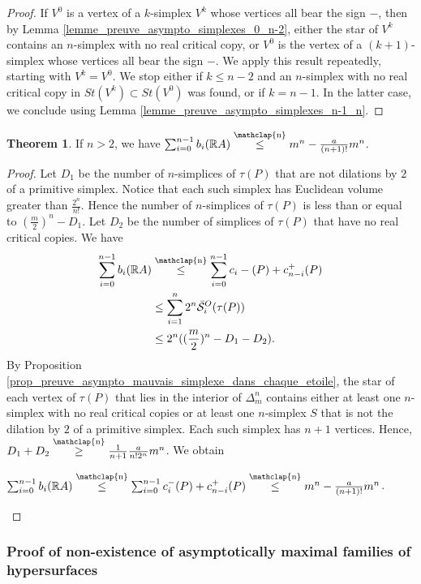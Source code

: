 \documentclass[12pt]{article}
\newcommand\customleq{\stackrel{\mathclap{\normalfont\scriptsize\mbox{n}}}{\leq}}
\newcommand\customgeq{\stackrel{\mathclap{\normalfont\scriptsize\mbox{n}}}{\geq}}
\theoremstyle{definition}
\newtheorem{thm}{Theorem}[section]
\begin{document}
\begin{proof}
    If $V^0$ is a vertex of a $k$-simplex $V^k$ whose vertices all bear the sign $-$, then by Lemma \ref{lemme_preuve_asympto_simplexes_0_n-2}, either the star of $V^k$ contains an $n$-simplex with no real critical copy, or $V^0$ is the vertex of a $(k+1)$-simplex whose vertices all bear the sign $-$. We apply this result repeatedly, starting with $V^k = V^0$. We stop either if $k \leq n-2$ and an $n$-simplex with no real critical copy in $St(V^k) \subset St(V^0)$ was found, or if $k = n-1$. In the latter case, we conclude using Lemma \ref{lemme_preuve_asympto_simplexes_n-1_n}.
\end{proof}

\begin{thm}
    \label{thm_nombre_betti_total_cas2}
    If $n>2$, we have $\sum_{i=0}^{n-1}b_i(\mathbb{R}A) \customleq m^n -\frac{a}{(n+1)!} m^n$.
\end{thm}

\begin{proof}
    Let $D_1$ be the number of $n$-simplices of $\tau(P)$ that are not dilations by $2$ of a primitive simplex. Notice that each such simplex has Euclidean volume greater than $\frac{2^{n}}{n!}$. Hence the number of $n$-simplices of $\tau(P)$ is less than or equal to $(\frac{m}{2})^n - D_1$. Let $D_2$ be the number of simplices of $\tau(P)$ that have no real critical copies. We have 
    \begin{align*}\sum_{i=0}^{n-1}b_i(\mathbb{R}A) &\customleq \sum_{i=0}^{n-1} c_i-(P) + c_{n-i}^+(P) \\ 
    &\leq \sum_{i=1}^{n} 2^n \bar{\mathcal{S}}_i^O(\tau(P)) \\
    &\leq 2^n ((\frac{m}{2})^n - D_1 - D_2).\end{align*}
    By Proposition \ref{prop_preuve_asympto_mauvais_simplexe_dans_chaque_etoile}, the star of each vertex of $\tau(P)$ that lies in the interior of $\Delta_m^n$ contains either at least one $n$-simplex with no real critical copies or at least one $n$-simplex $S$ that is not the dilation by $2$ of a primitive simplex. Each such simplex has $n+1$ vertices. Hence, $D_1 + D_2 \customgeq \frac{1}{n+1}\frac{a}{n!2^n} m^n$.
    We obtain \begin{center}$\sum_{i=0}^{n-1}b_i(\mathbb{R}A) \customleq \sum_{i=0}^{n-1} c_i^-(P) + c_{n-i}^+(P) \customleq m^n - \frac{a}{(n+1)!} m^n$.\end{center}
\end{proof}

\subsubsection{Proof of non-existence of asymptotically maximal families of hypersurfaces}
\end{document}
